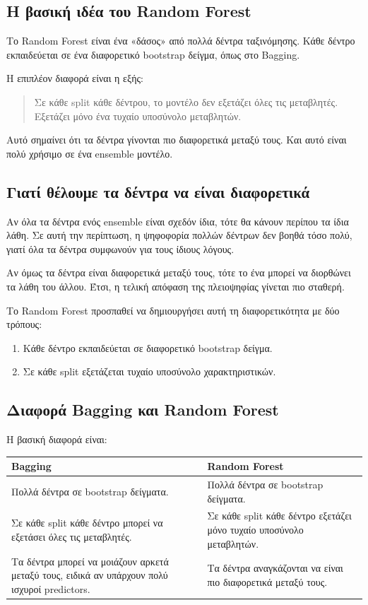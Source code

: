 \documentclass[12pt,a4paper]{article}
\begin{document}
\subsection{Η βασική ιδέα του Random Forest}

Το Random Forest είναι ένα «δάσος» από πολλά δέντρα ταξινόμησης. Κάθε δέντρο
εκπαιδεύεται σε ένα διαφορετικό bootstrap δείγμα, όπως στο Bagging.

Η επιπλέον διαφορά είναι η εξής:

\begin{quote}
Σε κάθε split κάθε δέντρου, το μοντέλο δεν εξετάζει όλες τις μεταβλητές.
Εξετάζει μόνο ένα τυχαίο υποσύνολο μεταβλητών.
\end{quote}

Αυτό σημαίνει ότι τα δέντρα γίνονται πιο διαφορετικά μεταξύ τους. Και αυτό
είναι πολύ χρήσιμο σε ένα ensemble μοντέλο.

\subsection{Γιατί θέλουμε τα δέντρα να είναι διαφορετικά}

Αν όλα τα δέντρα ενός ensemble είναι σχεδόν ίδια, τότε θα κάνουν περίπου τα
ίδια λάθη. Σε αυτή την περίπτωση, η ψηφοφορία πολλών δέντρων δεν βοηθά τόσο
πολύ, γιατί όλα τα δέντρα συμφωνούν για τους ίδιους λόγους.

Αν όμως τα δέντρα είναι διαφορετικά μεταξύ τους, τότε το ένα μπορεί να
διορθώνει τα λάθη του άλλου. Έτσι, η τελική απόφαση της πλειοψηφίας γίνεται
πιο σταθερή.

Το Random Forest προσπαθεί να δημιουργήσει αυτή τη διαφορετικότητα με δύο
τρόπους:

\begin{enumerate}[label=\arabic*.]
    \item Κάθε δέντρο εκπαιδεύεται σε διαφορετικό bootstrap δείγμα.
    \item Σε κάθε split εξετάζεται τυχαίο υποσύνολο χαρακτηριστικών.
\end{enumerate}

\subsection{Διαφορά Bagging και Random Forest}

Η βασική διαφορά είναι:

\begin{center}
\begin{tabular}{p{5cm}p{7cm}}
\toprule
\textbf{Bagging} & \textbf{Random Forest} \\
\midrule
Πολλά δέντρα σε bootstrap δείγματα. &
Πολλά δέντρα σε bootstrap δείγματα. \\
\addlinespace
Σε κάθε split κάθε δέντρο μπορεί να εξετάσει όλες τις μεταβλητές. &
Σε κάθε split κάθε δέντρο εξετάζει μόνο τυχαίο υποσύνολο μεταβλητών. \\
\addlinespace
Τα δέντρα μπορεί να μοιάζουν αρκετά μεταξύ τους, ειδικά αν υπάρχουν πολύ ισχυροί predictors. &
Τα δέντρα αναγκάζονται να είναι πιο διαφορετικά μεταξύ τους. \\
\bottomrule
\end{tabular}
\end{center}
\end{document}
